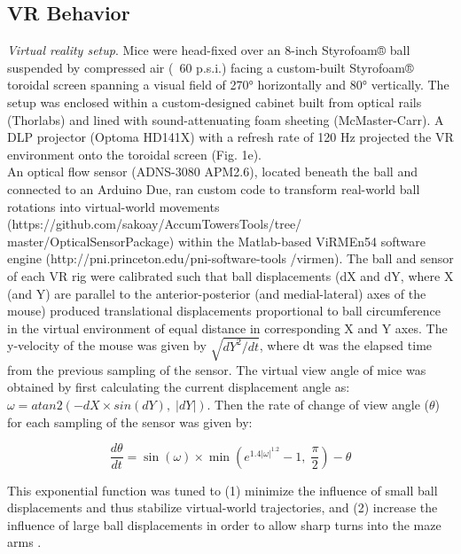 \subsection{VR Behavior}
\label{sec:ap1:m4}
\textit{Virtual reality setup}. Mice were head-fixed over an 8-inch Styrofoam® ball suspended by compressed air (~60 p.s.i.) facing a custom-built Styrofoam® toroidal screen spanning a visual field of 270° horizontally and 80° vertically. The setup was enclosed within a custom-designed cabinet built from optical rails (Thorlabs) and lined with sound-attenuating foam sheeting (McMaster-Carr). A DLP projector (Optoma HD141X) with a refresh rate of 120 Hz projected the VR environment onto the toroidal screen (Fig. 1e). \\
An optical flow sensor (ADNS-3080 APM2.6), located beneath the ball and connected to an Arduino Due, ran custom code to transform real-world ball rotations into virtual-world movements (https://github.com/sakoay/AccumTowersTools/tree/ master/OpticalSensorPackage) within the Matlab-based ViRMEn54 software engine (http://pni.princeton.edu/pni-software-tools /virmen). The ball and sensor of each VR rig were calibrated such that ball displacements (dX and dY, where X (and Y) are parallel to the anterior-posterior (and medial-lateral) axes of the mouse) produced translational displacements proportional to ball circumference in the virtual environment of equal distance in corresponding X and Y axes. The y-velocity of the mouse was given by $\sqrt {dY^2/dt}$, where dt was the elapsed time from the previous sampling of the sensor. The virtual view angle of mice was obtained by first calculating the current displacement angle as: $\omega = atan2\left( { - dX \times sin(dY),\;\left| {dY} \right|} \right)$. Then the rate of change of view angle ($\theta$) for each sampling of the sensor was given by:

\begin{equation} \label{meq1}
\frac{{d\theta }}{{dt}} = \sin \left( \omega \right) \times \min \left( {e^{1.4\left| \omega \right|^{1.2}} - 1,\;\frac{\pi }{2}} \right) - \theta
\end{equation}

This exponential function was tuned to (1) minimize the influence of small ball displacements and thus stabilize virtual-world trajectories, and (2) increase the influence of large ball displacements in order to allow sharp turns into the maze arms \cite{pinto_accumulation--evidence_2018}. \\

